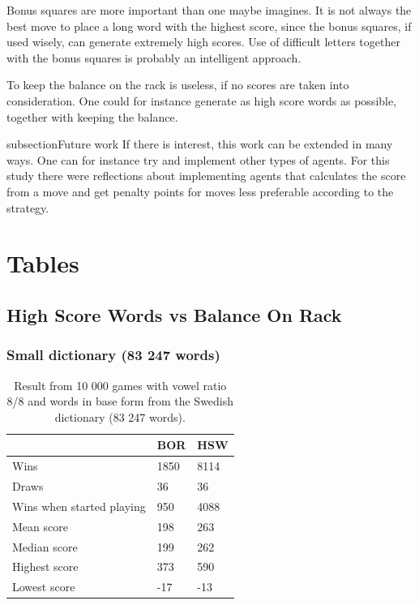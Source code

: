 \documentclass[a4paper, 12pt]{report}
\begin{document}
Bonus squares are more important than one maybe imagines. It is not always the best move to place a long word with the highest score, since the bonus squares, if used wisely, can generate extremely high scores. Use of difficult letters together with the bonus squares is probably an intelligent approach.

To keep the balance on the rack is useless, if no scores are taken into consideration. One could for instance generate as high score words as possible, together with keeping the balance.

subsection{Future work}
If there is interest, this work can be extended in many ways. One can for instance try and implement other types of agents. For this study there were reflections about implementing agents that calculates the score from a move and get penalty points for moves less preferable according to the strategy. 

\appendix
\chapter{Tables}

\section{High Score Words vs Balance On Rack}
\subsection{Small dictionary (83 247 words)}
\begin{table}[h]
\centering
    \begin{tabular}{ l | l | l }
   	& BOR & HSW \\
   	\hline
   	Wins & 1850 & 8114 \\
	Draws & 36 & 36 \\
	Wins when started playing & 950 & 4088 \\   	
	Mean score & 198 & 263 \\
	Median score & 199 & 262\\	 	 
	Highest score & 373 & 590 \\
	Lowest score & -17 & -13 \\		
    \end{tabular}
\caption{Result from 10 000 games with vowel ratio 8/8 and words in base form from the Swedish dictionary (83 247 words).}
\label{tab:borhswstats8smallDict}
\end{table}
\end{document}
